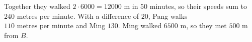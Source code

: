 Together they walked $2\cdot6000=12000$ m in $50$ minutes, so their speeds sum to $240$ metres per minute. With a difference of $20$, Pang walks $\boxed{110\text{ metres per minute}}$ and Ming $130$. Ming walked $6500$ m, so they met $\boxed{500\text{ m}}$ from $B$.
